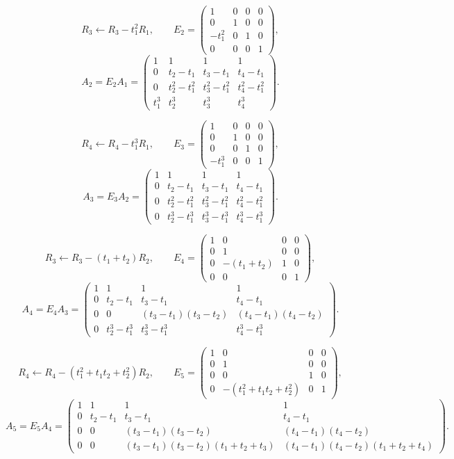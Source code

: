 \documentclass[10pt]{extarticle}
\begin{document}
\[
R_3\leftarrow R_3-t_1^2R_1,
\qquad
E_2=
\begin{pmatrix}
1 & 0 & 0 & 0\\
0 & 1 & 0 & 0\\
-t_1^2 & 0 & 1 & 0\\
0 & 0 & 0 & 1
\end{pmatrix},
\]
\[
A_2=E_2A_1=
\begin{pmatrix}
1 & 1 & 1 & 1\\
0 & t_2-t_1 & t_3-t_1 & t_4-t_1\\
0 & t_2^2-t_1^2 & t_3^2-t_1^2 & t_4^2-t_1^2\\
t_1^3 & t_2^3 & t_3^3 & t_4^3
\end{pmatrix}.
\]

\[
R_4\leftarrow R_4-t_1^3R_1,
\qquad
E_3=
\begin{pmatrix}
1 & 0 & 0 & 0\\
0 & 1 & 0 & 0\\
0 & 0 & 1 & 0\\
-t_1^3 & 0 & 0 & 1
\end{pmatrix},
\]
\[
A_3=E_3A_2=
\begin{pmatrix}
1 & 1 & 1 & 1\\
0 & t_2-t_1 & t_3-t_1 & t_4-t_1\\
0 & t_2^2-t_1^2 & t_3^2-t_1^2 & t_4^2-t_1^2\\
0 & t_2^3-t_1^3 & t_3^3-t_1^3 & t_4^3-t_1^3
\end{pmatrix}.
\]

\[
R_3\leftarrow R_3-(t_1+t_2)R_2,
\qquad
E_4=
\begin{pmatrix}
1 & 0 & 0 & 0\\
0 & 1 & 0 & 0\\
0 & -(t_1+t_2) & 1 & 0\\
0 & 0 & 0 & 1
\end{pmatrix},
\]
\[
A_4=E_4A_3=
\begin{pmatrix}
1 & 1 & 1 & 1\\
0 & t_2-t_1 & t_3-t_1 & t_4-t_1\\
0 & 0 & (t_3-t_1)(t_3-t_2) & (t_4-t_1)(t_4-t_2)\\
0 & t_2^3-t_1^3 & t_3^3-t_1^3 & t_4^3-t_1^3
\end{pmatrix}.
\]

\[
R_4\leftarrow R_4-(t_1^2+t_1t_2+t_2^2)R_2,
\qquad
E_5=
\begin{pmatrix}
1 & 0 & 0 & 0\\
0 & 1 & 0 & 0\\
0 & 0 & 1 & 0\\
0 & -(t_1^2+t_1t_2+t_2^2) & 0 & 1
\end{pmatrix},
\]
\[
A_5=E_5A_4=
\begin{pmatrix}
1 & 1 & 1 & 1\\
0 & t_2-t_1 & t_3-t_1 & t_4-t_1\\
0 & 0 & (t_3-t_1)(t_3-t_2) & (t_4-t_1)(t_4-t_2)\\
0 & 0 & (t_3-t_1)(t_3-t_2)(t_1+t_2+t_3) & (t_4-t_1)(t_4-t_2)(t_1+t_2+t_4)
\end{pmatrix}.
\]
\end{document}

